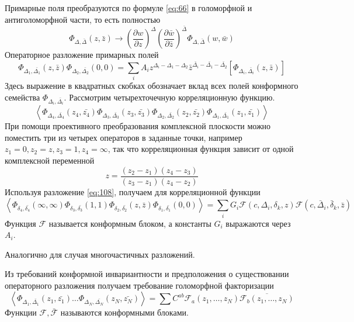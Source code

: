 \documentclass[a4paper,12pt]{article}
\theoremstyle{definition} \newtheorem{Def}{Definition}
\begin{document}
Примарные поля преобразуются по формуле \eqref{eq:66} в голоморфной и антиголоморфной части, то есть полностью
\begin{equation}
  \label{eq:106}
  \Phi_{\Delta,\bar{\Delta}}(z,\bar{z})\to \left(\frac{\partial w}{\partial z}\right)^{\Delta}
  \left(\frac{\partial \bar{w}}{\partial \bar{z}}\right)^{\bar{\Delta}}\Phi_{\Delta,\bar{\Delta}}(w,\bar{w})
\end{equation}
Операторное разложение примарных полей
\begin{equation}
  \label{eq:108}
  \Phi_{\Delta_1,\bar{\Delta_1}}(z,\bar{z})\Phi_{\Delta_2,\bar{\Delta_2}}(0,0)=\sum_i A_i z^{\Delta_i-\Delta_1-\Delta_2}\bar{z}^{\bar{\Delta_i}-\bar{\Delta_1}-\bar{\Delta_2}}\left[\Phi_{\Delta_i,\bar{\Delta_i}}(z,\bar{z})\right]
\end{equation}
Здесь выражение в квадратных скобках обозначает вклад всех полей конформного семейства $\Phi_{\Delta_i,\bar{\Delta_i}}$. Рассмотрим четырехточечную корреляционную функцию.
\begin{equation}
  \label{eq:109}
  \left< \Phi_{\Delta_4,\bar{\Delta_4}}(z_4,\bar{z_4}) \Phi_{\Delta_3,\bar{\Delta_3}}(z_3,\bar{z_3}) \Phi_{\Delta_2,\bar{\Delta_2}}(z_2,\bar{z_2})  \Phi_{\Delta_1,\bar{\Delta_1}}(z_1,\bar{z_1})\right>
\end{equation}
При помощи проективного преобразования комплексной плоскости можно поместить три из четырех операторов в заданные точки, например $z_1=0,z_2=z,z_3=1,z_4=\infty$, так что корреляционная функция зависит от одной комплексной переменной
\begin{equation}
  \label{eq:110}
  z=\frac{(z_2-z_1)(z_4-z_3)}{(z_3-z_1)(z_4-z_2)}
\end{equation}
Используя разложение \eqref{eq:108}, получаем для корреляционной функции
\begin{equation}
  \label{eq:111}
   \left< \Phi_{\delta_4,\bar{\delta_4}}(\infty,\infty) \Phi_{\delta_3,\bar{\delta_3}}(1,1) \Phi_{\delta_2,\bar{\delta_2}}(z,\bar{z})  \Phi_{\delta_1,\bar{\delta_1}}(0,0)\right>=\sum_i G_i \mathcal{F}(c,\Delta_i,\delta_k,z)\mathcal{F}(c,\bar \Delta_i,\bar \delta_k,\bar z)
\end{equation}
Функция $\mathcal{F}$ называется конформным блоком, а константы $G_i$ выражаются через $A_i$. 

Аналогично для случая многочастичных разложений.
 
Из требований конформной инвариантности и предположения о существовании операторного разложения получаем требование голоморфной факторизации
\begin{equation}
  \label{eq:107}
  \left< \Phi_{\Delta_1,\bar{\Delta_1}}(z_1,\bar{z_1})\dots \Phi_{\Delta_N,\bar{\Delta_N}}(z_N,\bar{z_N})\right>=
  \sum C^{ab} \mathcal{F}_a(z_1,\dots,z_N)\overline{\mathcal{F}_b(z_1,\dots,z_N)}
\end{equation}
Функции $\mathcal{F},\bar{\mathcal{F}}$ называются конформными блоками. 
\end{document}
